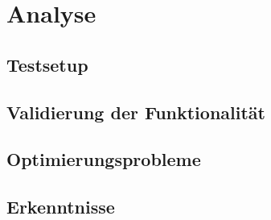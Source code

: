 \chapter{Analyse}

\section{Testsetup}
\section{Validierung der Funktionalität}
\section{Optimierungsprobleme}
\section{Erkenntnisse}
